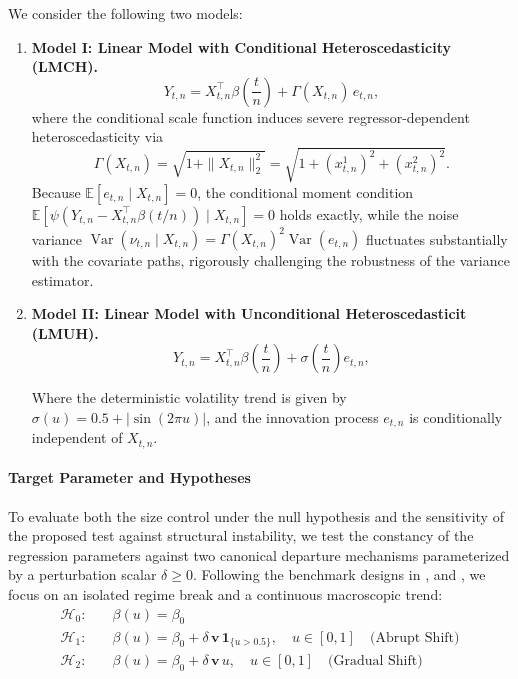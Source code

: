 \documentclass[10pt, a4paper]{article}
\theoremstyle{assumption}
\theoremstyle{definition}
\theoremstyle{theorem}
\begin{document}
We consider the following two models:

\begin{enumerate}[label=(\roman*)]
    \item \textbf{Model I: Linear Model with Conditional Heteroscedasticity (LMCH).}
    \begin{equation}
    \label{eq: model1reg}
        Y_{t,n} = X_{t,n}^\top \beta\left(\frac{t}{n}\right) + \Gamma(X_{t,n}) \, e_{t,n},
    \end{equation}
    where the conditional scale function induces severe regressor-dependent heteroscedasticity via
    \begin{equation*}
        \Gamma(X_{t,n}) = \sqrt{1 + \|X_{t,n}\|_2^2} = \sqrt{1 + (x^1_{t,n})^2 + (x^2_{t,n})^2}.
    \end{equation*}
    Because $\mathbb{E}[e_{t,n} \mid X_{t,n}] = 0$, the conditional moment condition $\mathbb{E}[\psi(Y_{t,n} - X_{t,n}^\top \beta(t/n)) \mid X_{t,n}] = 0$ holds exactly, while the noise variance $\operatorname{Var}(\nu_{t,n} \mid X_{t,n}) = \Gamma(X_{t,n})^2 \operatorname{Var}(e_{t,n})$ fluctuates substantially with the covariate paths, rigorously challenging the robustness of the variance estimator.

    \item \textbf{Model II:  Linear Model with Unconditional Heteroscedasticit (LMUH).}
    \begin{equation}
    \label{eq: model2reg}
        Y_{t,n} = X_{t,n}^\top \beta\left(\frac{t}{n}\right) + \sigma\left(\frac{t}{n}\right) e_{t,n},
    \end{equation}

    Where the deterministic volatility trend is given by $\sigma(u) = 0.5 + |\sin(2\pi u)|$, and the innovation process $e_{t,n}$ is conditionally independent of $X_{t,n}$.
\end{enumerate}

\paragraph{Target Parameter and Hypotheses}
To evaluate both the size control under the null hypothesis and the sensitivity of the proposed test against structural instability, we test the constancy of the regression parameters against two canonical departure mechanisms parameterized by a perturbation scalar $\delta \ge 0$. Following the benchmark designs in \citet{zhang2012}, \citet{Mies2023} and \citet{liu2024}, we focus on an isolated regime break and a continuous macroscopic trend:
\begin{align*}
    \mathcal{H}_0: \quad & \beta(u) =  \beta_0 \\
    \mathcal{H}_1: \quad & \beta(u) = \beta_0 + \delta \, \mathbf{v} \, \mathbf{1}_{\{u > 0.5\}}, \quad u \in [0, 1] 
     \quad \text{(Abrupt Shift)} \\
    \mathcal{H}_2: \quad & \beta(u) = \beta_0 + \delta \, \mathbf{v} \, u, \quad u \in [0, 1] \quad \text{(Gradual Shift)}
\end{align*}
\end{document}
